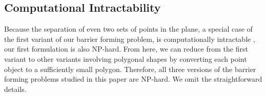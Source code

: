 \subsection{Computational Intractability}
Because the separation of even two sets of points in the plane, 
a special case of the first variant of our barrier forming problem, 
is computationally intractable \cite{demaine2005separating}, 
our first formulation is also NP-hard. 
From here, we can reduce from the first variant to other variants involving polygonal shapes by converting each point object to a sufficiently small polygon. Therefore, all three versions of the barrier forming problems studied in this paper are NP-hard. We omit the straightforward details. 